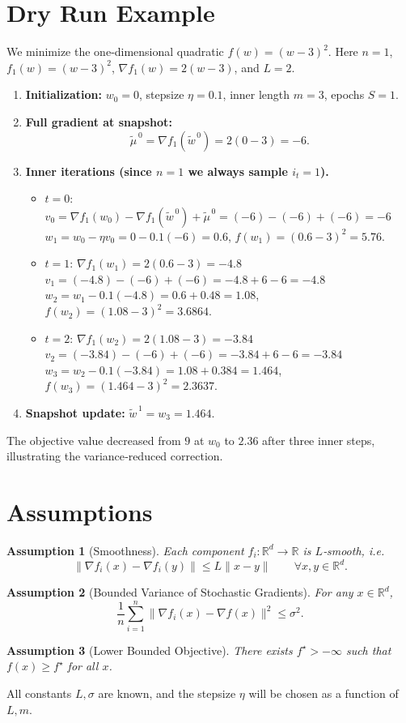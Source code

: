 \documentclass{article}
\newtheorem{assumption}{Assumption}
\newcommand{\RR}{\mathbb{R}}
\begin{document}
\section*{Dry Run Example}
We minimize the one‑dimensional quadratic $f(w)=(w-3)^2$.
Here $n=1$, $f_1(w)= (w-3)^2$, $\nabla f_1(w)=2(w-3)$, and $L=2$.

\begin{enumerate}[label=\arabic*.]
\item \textbf{Initialization:} $w_0=0$, stepsize $\eta=0.1$, inner length $m=3$, epochs $S=1$.
\item \textbf{Full gradient at snapshot:}
\[
\tilde{\mu}^{\,0}= \nabla f_1(\tilde{w}^{\,0}) = 2(0-3) = -6.
\]
\item \textbf{Inner iterations (since $n=1$ we always sample $i_t=1$).}
\begin{itemize}
\item $t=0$: $v_0 = \nabla f_1(w_0)-\nabla f_1(\tilde{w}^{\,0})+\tilde{\mu}^{\,0}=(-6)-(-6)+(-6)=-6$\\
$w_1 = w_0 -\eta v_0 = 0-0.1(-6)=0.6$,  $f(w_1)=(0.6-3)^2=5.76$.
\item $t=1$: $\nabla f_1(w_1)=2(0.6-3)=-4.8$\\
$v_1 = (-4.8)-(-6)+(-6) = -4.8+6-6 = -4.8$\\
$w_2 = w_1-0.1(-4.8)=0.6+0.48=1.08$, $f(w_2)=(1.08-3)^2=3.6864$.
\item $t=2$: $\nabla f_1(w_2)=2(1.08-3)=-3.84$\\
$v_2 = (-3.84)-(-6)+(-6)= -3.84+6-6 = -3.84$\\
$w_3 = w_2-0.1(-3.84)=1.08+0.384=1.464$, $f(w_3)=(1.464-3)^2=2.3637$.
\end{itemize}
\item \textbf{Snapshot update:} $\tilde{w}^{\,1}=w_3=1.464$.
\end{enumerate}
The objective value decreased from $9$ at $w_0$ to $2.36$ after three inner steps, illustrating the variance‑reduced correction.

\section*{Assumptions}
\begin{assumption}[Smoothness]\label{ass:smooth}
Each component $f_i:\RR^{d}\to\RR$ is $L$‑smooth, i.e.
\[
\|\nabla f_i(x)-\nabla f_i(y)\|\le L\|x-y\|\qquad\forall x,y\in\RR^{d}.
\tag{A1}
\]
\end{assumption}
\begin{assumption}[Bounded Variance of Stochastic Gradients]\label{ass:var}
For any $x\in\RR^{d}$,
\[
\frac{1}{n}\sum_{i=1}^{n}\|\nabla f_i(x)-\nabla f(x)\|^{2}\le\sigma^{2}.
\tag{A2}
\]
\end{assumption}
\begin{assumption}[Lower Bounded Objective]\label{ass:lb}
There exists $f^{\star}>-\infty$ such that $f(x)\ge f^{\star}$ for all $x$.
\end{assumption}
All constants $L,\sigma$ are known, and the stepsize $\eta$ will be chosen as a function of $L,m$.
\end{document}

